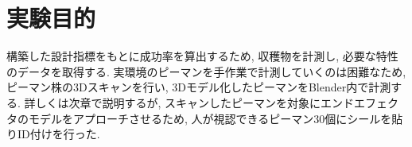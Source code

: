 \section{実験目的}
構築した設計指標をもとに成功率を算出するため, 収穫物を計測し, 必要な特性のデータを取得する.
実環境のピーマンを手作業で計測していくのは困難なため, ピーマン株の3Dスキャンを行い, 3Dモデル化したピーマンをBlender内で計測する.
詳しくは次章で説明するが, スキャンしたピーマンを対象にエンドエフェクタのモデルをアプローチさせるため, 人が視認できるピーマン30個にシールを貼りID付けを行った.
